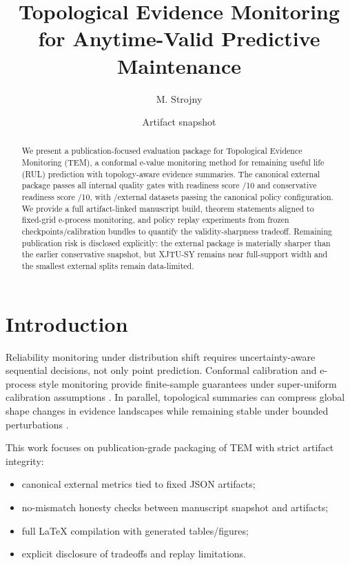 \documentclass[11pt]{article}
\title{Topological Evidence Monitoring for Anytime-Valid Predictive Maintenance}
\author{M. Strojny}
\date{Artifact snapshot \ArtifactSnapshotDate}
\begin{document}
\maketitle

\begin{abstract}
We present a publication-focused evaluation package for Topological Evidence Monitoring (TEM), a conformal e-value monitoring method for remaining useful life (RUL) prediction with topology-aware evidence summaries. The canonical external package passes all internal quality gates with readiness score \ReadinessScore/10 and conservative readiness score \ReadinessConservativeScore/10, with \ExternalDatasetsOk/\ExternalDatasetsTotal external datasets passing the canonical policy configuration. We provide a full artifact-linked manuscript build, theorem statements aligned to fixed-grid e-process monitoring, and policy replay experiments from frozen checkpoints/calibration bundles to quantify the validity-sharpness tradeoff. Remaining publication risk is disclosed explicitly: the external package is materially sharper than the earlier conservative snapshot, but XJTU-SY remains near full-support width and the smallest external splits remain data-limited.
\end{abstract}

\section{Introduction}
Reliability monitoring under distribution shift requires uncertainty-aware sequential decisions, not only point prediction. Conformal calibration and e-process style monitoring provide finite-sample guarantees under super-uniform calibration assumptions \citep{shafer2008tutorial,vovk2005algorithmic,howard2021timeuniform}. In parallel, topological summaries can compress global shape changes in evidence landscapes while remaining stable under bounded perturbations \citep{edelsbrunner2002topological,cohen2007stability}.

This work focuses on publication-grade packaging of TEM with strict artifact integrity:
\begin{itemize}[leftmargin=1.3em]
\item canonical external metrics tied to fixed JSON artifacts;
\item no-mismatch honesty checks between manuscript snapshot and artifacts;
\item full LaTeX compilation with generated tables/figures;
\item explicit disclosure of tradeoffs and replay limitations.
\end{itemize}
\end{document}
